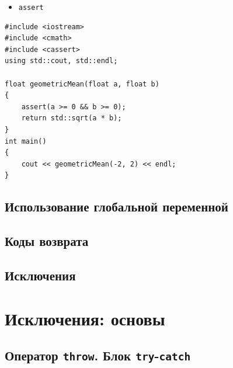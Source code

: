 \documentclass{article}
\begin{document}
\begin{itemize}
\item \texttt{assert}
\end{itemize}

\begin{lstlisting}
#include <iostream>
#include <cmath>
#include <cassert>
using std::cout, std::endl;

float geometricMean(float a, float b)
{
    assert(a >= 0 && b >= 0);
    return std::sqrt(a * b);
}
int main()
{
    cout << geometricMean(-2, 2) << endl;
}
\end{lstlisting}


\subsection*{Использование глобальной переменной}
\subsection*{Коды возврата}
\subsection*{Исключения}


\newpage
\section*{Исключения: основы}
\subsection*{Оператор \texttt{throw}. Блок \texttt{try}-\texttt{catch}}
\end{document}
